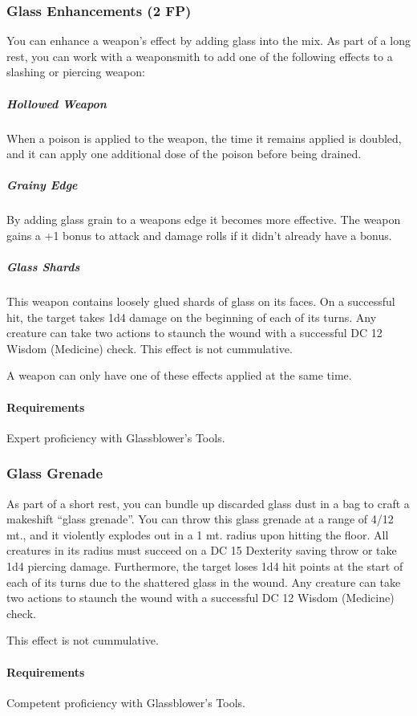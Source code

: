     \subsubsection{Glass Enhancements (2 FP)} \label{feat::glassenhancement}
        You can enhance a weapon's effect by adding glass into the mix.
        As part of a long rest, you can work with a weaponsmith to add one of the following effects to a slashing or piercing weapon:
        \subparagraph{Hollowed Weapon} When a poison is applied to the weapon, the time it remains applied is doubled, and it can apply one additional dose of the poison before being drained.
        \subparagraph{Grainy Edge} By adding glass grain to a weapons edge it becomes more effective.
        The weapon gains a +1 bonus to attack and damage rolls if it didn't already have a bonus.
        \subparagraph{Glass Shards} This weapon contains loosely glued shards of glass on its faces.
        On a successful hit, the target takes 1d4 damage on the beginning of each of its turns.
        Any creature can take two actions to staunch the wound with a successful DC 12 Wisdom (Medicine) check.
        This effect is not cummulative.

        A weapon can only have one of these effects applied at the same time.
        \paragraph{Requirements} Expert proficiency with Glassblower's Tools.
    \subsubsection{Glass Grenade} \label{feat::glassgrenade}
        As part of a short rest, you can bundle up discarded glass dust in a bag to craft a makeshift ``glass grenade''.
        You can throw this glass grenade at a range of 4/12 mt., and it violently explodes out in a 1 mt. radius upon hitting the floor.
        All creatures in its radius must succeed on a DC 15 Dexterity saving throw or take 1d4 piercing damage.
        Furthermore, the target loses 1d4 hit points at the start of each of its turns due to the shattered glass in the wound.
        Any creature can take two actions to staunch the wound with a successful DC 12 Wisdom (Medicine) check.

        This effect is not cummulative.
        \paragraph{Requirements} Competent proficiency with Glassblower's Tools.
